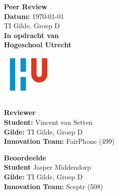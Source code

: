 \documentclass[a4paper]{report}
\begin{document}
\begin{titlepage}
  \begin{center}
      \vspace*{.9cm}
      \Huge
      \textbf{ Peer Review }\\
      \vspace{0.2cm}
      \small \textbf{Datum:} \today \\
      \small TI Gilde, Groep D \\

      \vspace{2cm}
      \normalsize
      \vspace{1cm}
      \Large
      \textbf{In opdracht van}\\
      \large
      \textbf{Hogeschool Utrecht} \\
      \includegraphics[width=0.2\textwidth]{Images/logouni.png}
      \vfill

      \begin{minipage}{0.45\textwidth}
        \large
        \textbf{Reviewer}\\
        \normalsize
        \textbf{Student:} Vincent van Setten \\
        \textbf{Gilde:} TI Gilde, Groep D\\
        \textbf{Innovation Team:} FairPhone (499) \\
        \vspace{2cm}
      \end{minipage}
      \hfill
      \begin{minipage}{0.45\textwidth}
        \large
        \textbf{Beoordeelde}\\
        \normalsize
        \textbf{Student} Jasper Middendorp  \\
        \textbf{Gilde:} TI Gilde, Groep D\\
        \textbf{Innovation Team:} Sceptr (508) \\
        \vspace{2cm}
      \end{minipage}
    \end{center}
\end{titlepage}


\tableofcontents
\end{document}
